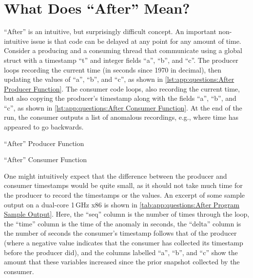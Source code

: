 
\section{What Does ``After'' Mean?}
\label{sec:app:questions:What Does ``After'' Mean?}

``After'' is an intuitive, but surprisingly difficult concept.
An important non-intuitive issue is that code can be delayed at
any point for any amount of time.
Consider a producing and a consuming thread that communicate using
a global struct with a timestamp ``t'' and integer fields ``a'', ``b'',
and ``c''.
The producer loops recording the current time
(in seconds since 1970 in decimal),
then updating the values of ``a'', ``b'', and ``c'',
as shown in \cref{lst:app:questions:After Producer Function}.
The consumer code loops, also recording the current time, but also
copying the producer's timestamp along with the fields ``a'',
``b'', and ``c'', as shown in
\cref{lst:app:questions:After Consumer Function}.
At the end of the run, the consumer outputs a list of anomalous recordings,
e.g., where time has appeared to go backwards.

\begin{listing}

\caption{``After'' Producer Function}
\label{lst:app:questions:After Producer Function}
\end{listing}

\begin{listing}
\caption{``After'' Consumer Function}
\label{lst:app:questions:After Consumer Function}
\end{listing}

\QuickQuizEnd

One might intuitively expect that the difference between the producer
and consumer timestamps would be quite small, as it should not take
much time for the producer to record the timestamps or the values.
An excerpt of some sample output on a dual-core 1\,GHz x86 is shown in
\cref{tab:app:questions:After Program Sample Output}.
Here, the ``seq'' column is the number of times through the loop,
the ``time'' column is the time of the anomaly in seconds, the ``delta''
column is the number of seconds the consumer's timestamp follows that
of the producer (where a negative value indicates that the consumer
has collected its timestamp before the producer did), and the
columns labelled ``a'', ``b'', and ``c'' show the amount that these
variables increased since the prior snapshot collected by the consumer.

